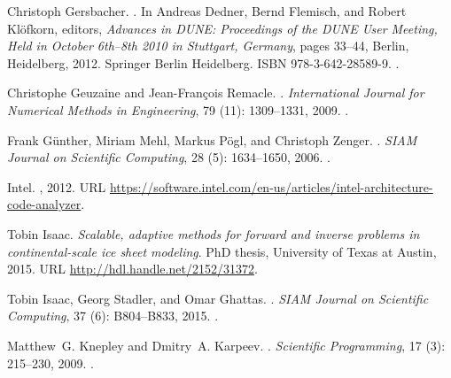 \documentclass[11pt, a4paper]{scrartcl}
\begin{document}
\begin{thebibliography}{35}
Christoph Gersbacher.
.
\newblock In Andreas Dedner, Bernd Flemisch, and Robert Kl{\"o}fkorn, editors,
  \emph{Advances in DUNE: Proceedings of the DUNE User Meeting, Held in October
  6th--8th 2010 in Stuttgart, Germany}, pages 33--44, Berlin, Heidelberg, 2012.
  Springer Berlin Heidelberg.
\newblock ISBN 978-3-642-28589-9.
\newblock {}.

Christophe Geuzaine and Jean-Fran{\c{c}}ois Remacle.
.
\newblock \emph{International Journal for Numerical Methods in Engineering},
  79 (11): 1309--1331, 2009.
\newblock {}.

Frank G\"{u}nther, Miriam Mehl, Markus P\"{o}gl, and Christoph Zenger.
.
\newblock \emph{SIAM Journal on Scientific Computing}, 28
  (5): 1634--1650, 2006.
\newblock {}.

Intel.
, 2012.
\newblock URL
  \url{https://software.intel.com/en-us/articles/intel-architecture-code-analyzer}.

Tobin Isaac.
\newblock \emph{{Scalable, adaptive methods for forward and inverse problems in
  continental-scale ice sheet modeling}}.
\newblock PhD thesis, University of Texas at Austin, 2015.
\newblock URL \url{http://hdl.handle.net/2152/31372}.

Tobin Isaac, Georg Stadler, and Omar Ghattas.
.
\newblock \emph{SIAM Journal on Scientific Computing}, 37
  (6): B804--B833, 2015.
\newblock {}.

Matthew~G. Knepley and Dmitry~A. Karpeev.
.
\newblock \emph{Scientific Programming}, 17 (3): 215--230,
  2009.
\newblock {}.


\end{thebibliography}
\end{document}
